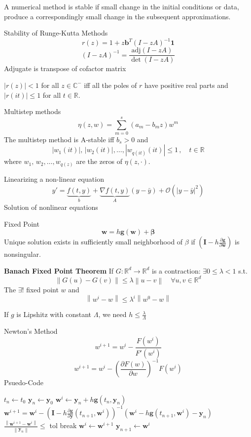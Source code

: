 \documentclass[letterpaper]{article}
\providecommand{\abs}[1]{\left\lvert#1\right\rvert}
\providecommand{\norm}[1]{\left\lVert#1\right\rVert}
\begin{document}
\begin{multicols}{2}
A numerical method is stable if small change in the initial conditions or data,
produce a correspondingly small change in the subsequent approximations.

Stability of Runge-Kutta Methods
\[
r(z)=1+z\mathbf{b}^T(I-zA)^{-1}\mathbf{1}
\]
\[
(I-zA)^{-1}=\frac{\mathrm{adj}(I-zA)}{\det(I-zA)}
\]
Adjugate is transpose of cofactor matrix

$\abs{r(z)}<1$ for all $z\in\mathbb{C}^-$ iff all the poles of $r$ have positive
real parts and $\abs{r(it)}\le 1$ for all $t\in\mathbb{R}$.

Multistep methods
\[
\eta(z,w)=\sum_{m=0}^s(a_m-b_mz)w^m
\]
The multistep method is A-stable iff $b_s>0$ and
\[
\abs{w_1(it)},\,\abs{w_2(it)},\dots,\abs{w_{q(it)}(it)}\le 1\,,\quad
t\in\mathbb{R}
\]
where $w_1,\,w_2,\dots,w_{q(z)}$ are the zeros of $\eta(z,\cdot)$.

Linearizing a non-linear equation
\[
y'=\underbrace{f(t,y)}_{b}+\underbrace{\nabla f(t,y)}_{A}(y-\bar y)
+\mathcal{O}(\abs{y-\bar y}^2)
\]
Solution of nonlinear equations

Fixed Point
\[
\mathbf{w}=h\mathbf{g}(\mathbf{w})+\boldsymbol\beta
\]
Unique solution exists in sufficiently small neighborhood of $\beta$ if
$\left(\mathbf{I}-h\frac{\partial\mathbf{g}}{\partial\mathbf{w}}\right)$ is
nonsingular.

\textbf{Banach Fixed Point Theorem}
If $G:\mathbb{R}^d\rightarrow\mathbb{R}^d$ is a contraction: $\exists
0\le\lambda<1$ s.t.
\[
\norm{G(u)-G(v)}\le\lambda\norm{u-v}\quad\forall u,v\in\mathbb{R}^d
\]
The $\exists!$ fixed point $w$ and 
\[
\norm{w^i-w}\le\lambda^i\norm{w^0-w}
\]

If $g$ is Lipshitz with constant $\Lambda$, we need
$h\le\frac{\lambda}{\Lambda}$

Newton's Method
\[
w^{i+1}=w^i-\frac{F(w^i)}{F'(w^i)}
\]
\[
w^{i+1}=w^i-\left(\frac{\partial F(w)}{\partial w}\right)^{-1}F(w^i)
\]
Psuedo-Code\\
\begin{minipage}[t]{\textwidth}
\begin{algorithmic}
\STATE $t_n\gets t_0$
\STATE $\mathbf{y}_n\gets \mathbf{y}_0$
    \STATE $\mathbf{w}^i\gets \mathbf{y}_n+h\mathbf{g}(t_n,\mathbf{y}_n)$
        \STATE $\mathbf{w}^{i+1} = \mathbf{w}^{i}-
        \left(\mathbf{I}-h\frac{\partial\mathbf{g}}{\partial\mathbf{y}}(t_{n+1},\mathbf{w}^i)\right)^{-1}
        \left(\mathbf{w}^i-h\mathbf{g}(t_{n+1},\mathbf{w}^i)-\mathbf{y}_n\right)$
        \IF
        {$\frac{\norm{\mathbf{w}^{i+1}-\mathbf{w}^i}}{\norm{\mathbf{y}_n}}\le$ tol}
            \STATE break
        \ENDIF
        \STATE $\mathbf{w}^i\gets\mathbf{w}^{i+1}$
    \ENDFOR
    \STATE $\mathbf{y}_{n+1}\gets\mathbf{w}^i$
\ENDFOR
\end{algorithmic}
\end{minipage}


\end{multicols}
\end{document}
